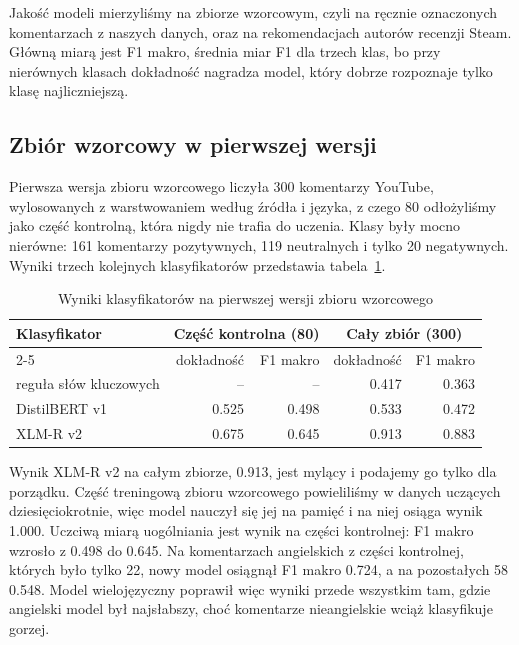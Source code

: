 Jakość modeli mierzyliśmy na zbiorze wzorcowym, czyli na ręcznie oznaczonych komentarzach z naszych danych, oraz na rekomendacjach autorów recenzji Steam.
Główną miarą jest F1 makro, średnia miar F1 dla trzech klas, bo przy nierównych klasach dokładność nagradza model, który dobrze rozpoznaje tylko klasę najliczniejszą.

\subsection{Zbiór wzorcowy w pierwszej wersji}
\label{sec:eval-gold-v1}

Pierwsza wersja zbioru wzorcowego liczyła 300 komentarzy YouTube, wylosowanych z warstwowaniem według źródła i języka, z czego 80 odłożyliśmy jako część kontrolną, która nigdy nie trafia do uczenia.
Klasy były mocno nierówne: 161 komentarzy pozytywnych, 119 neutralnych i tylko 20 negatywnych.
Wyniki trzech kolejnych klasyfikatorów przedstawia tabela~\ref{tab:gold-v1}.

\begin{table}[hbp]
  \caption{Wyniki klasyfikatorów na pierwszej wersji zbioru wzorcowego}
  \label{tab:gold-v1}
  \centering
  \small
  \begin{tabular}{|l|r|r|r|r|}
    \hline
    Klasyfikator                    & \multicolumn{2}{c|}{Część kontrolna (80)} & \multicolumn{2}{c|}{Cały zbiór (300)} \\
    \cline{2-5}
                                    & dokładność  & F1 makro   & dokładność  & F1 makro                       \\
    \hline
    reguła słów kluczowych          & --          & --         & \num{0.417} & \num{0.363}                    \\
    \hline
    DistilBERT v1                   & \num{0.525} & \num{0.498} & \num{0.533} & \num{0.472}                   \\
    \hline
    XLM-R v2                        & \num{0.675} & \num{0.645} & \num{0.913} & \num{0.883}                   \\
    \hline
  \end{tabular}
\end{table}

Wynik XLM-R v2 na całym zbiorze, \num{0.913}, jest mylący i podajemy go tylko dla porządku.
Część treningową zbioru wzorcowego powieliliśmy w danych uczących dziesięciokrotnie, więc model nauczył się jej na pamięć i na niej osiąga wynik \num{1.000}.
Uczciwą miarą uogólniania jest wynik na części kontrolnej: F1 makro wzrosło z \num{0.498} do \num{0.645}.
Na komentarzach angielskich z części kontrolnej, których było tylko 22, nowy model osiągnął F1 makro \num{0.724}, a na pozostałych 58 \num{0.548}.
Model wielojęzyczny poprawił więc wyniki przede wszystkim tam, gdzie angielski model był najsłabszy, choć komentarze nieangielskie wciąż klasyfikuje gorzej.

